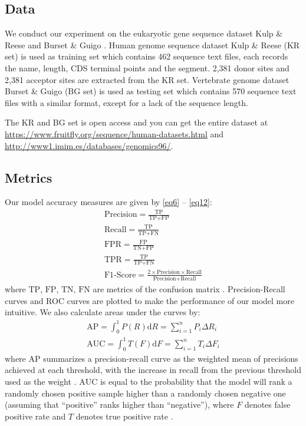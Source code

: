 \documentclass[journal,twoside]{IEEEtran}
\begin{document}
\subsection{Data}\label{3.1}

We conduct our experiment on the eukaryotic gene sequence dataset Kulp \& Reese \cite{reese1997improved} and Burset \& Guigo \cite{burset1996evaluation}. Human genome sequence dataset Kulp \& Reese (KR set) is used as training set which contains 462 sequence text files, each records the name, length, CDS terminal points and the segment. 2,381 donor sites and 2,381 acceptor sites are extracted from the KR set. Vertebrate genome dataset Burset \& Guigo (BG set) is used as testing set which contains 570 sequence text files with a similar format, except for a lack of the sequence length. 

The KR and BG set is open access and you can get the entire dataset at \url{https://www.fruitfly.org/sequence/human-datasets.html} and \url{http://www1.imim.es/databases/genomics96/}. 

\subsection{Metrics}\label{3.2}

Our model accuracy measures are given by \eqref{eq6} -- \eqref{eq12}: 
\begin{gather}
    \text{Precision} = \displaystyle\frac{\text{TP}}{\text{TP} + \text{FP}}\label{eq6} \\
    \text{Recall} = \displaystyle\frac{\text{TP}}{\text{TP} + \text{FN}}\label{eq7} \\
    \text{FPR} = \displaystyle\frac{\text{FP}}{\text{TN} + \text{FP}}\label{eq8} \\
    \text{TPR} = \displaystyle\frac{\text{TP}}{\text{TP} + \text{FN}}\label{eq9} \\
    \text{F1-Score} = \displaystyle\frac{2 \times \text{Precision} \times \text{Recall}}{\text{Precision} + \text{Recall}}\label{eq10}
\end{gather}
where $\text{TP}$, $\text{FP}$, $\text{TN}$, $\text{FN}$ are metrics of the confusion matrix \cite{stehman1997selecting}. Precision-Recall curves and ROC curves \cite{powers2020evaluation}\cite{fawcett2006introduction} are plotted to make the performance of our model more intuitive. We also calculate areas under the curves by: 
\begin{gather}
    \text{AP} = \int_0^1 P(R)\text{d}R = \sum\limits_{i=1}^n P_i\Delta R_i\label{eq11} \\
    \text{AUC} = \int_0^1 T(F)\text{d}F = \sum\limits_{i=1}^n T_i\Delta F_i\label{eq12}
\end{gather}
where $\text{AP}$ summarizes a precision-recall curve as the weighted mean of precisions achieved at each threshold, with the increase in recall from the previous threshold used as the weight \cite{zhu2004recall}. $\text{AUC}$ is equal to the probability that the model will rank a randomly chosen positive sample higher than a randomly chosen negative one (assuming that ``positive'' ranks higher than ``negative''), where $F$ denotes false positive rate and $T$ denotes true positive rate \cite{fawcett2006introduction}. 
\end{document}
